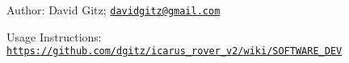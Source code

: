 Author\+: David Gitz; \href{mailto:davidgitz@gmail.com}{\tt davidgitz@gmail.\+com}

Usage Instructions\+: \href{https://github.com/dgitz/icarus_rover_v2/wiki/SOFTWARE_DEV}{\tt https\+://github.\+com/dgitz/icarus\+\_\+rover\+\_\+v2/wiki/\+S\+O\+F\+T\+W\+A\+R\+E\+\_\+\+D\+EV} 